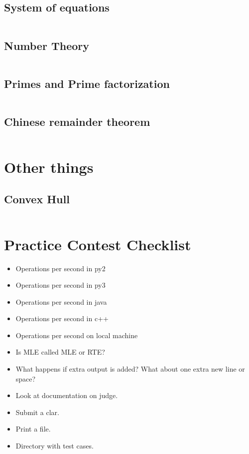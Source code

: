 \documentclass[8pt,a4paper,landscape,oneside]{amsart}
\newcommand{\codep}[1]{\inputminted[fontsize=\large,tabsize=2,baselinestretch=1]{py}{#1}}
\begin{document}
\begin{multicols*}{2}
\begin{large}
\subsection{System of equations}
\codep{gaussianelimination.py}
\subsection{Number Theory}
\codep{gcdbezout.py}
\subsection{Primes and Prime factorization}
\codep{primecalc.py}
\subsection{Chinese remainder theorem}
\codep{crt.py}
\section{Other things}
\subsection{Convex Hull}
\codep{convexhull.py}
\section{Practice Contest Checklist}
\begin{itemize}
    \item Operations per second in py2
    \item Operations per second in py3
    \item Operations per second in java
    \item Operations per second in c++
    \item Operations per second on local machine
    \item Is MLE called MLE or RTE?
    \item What happens if extra output is added? What about one extra new line or space?
    \item Look at documentation on judge.
    \item Submit a clar.
    \item Print a file.
    \item Directory with test cases.
\end{itemize}


\end{large}
\end{multicols*}
\end{document}
